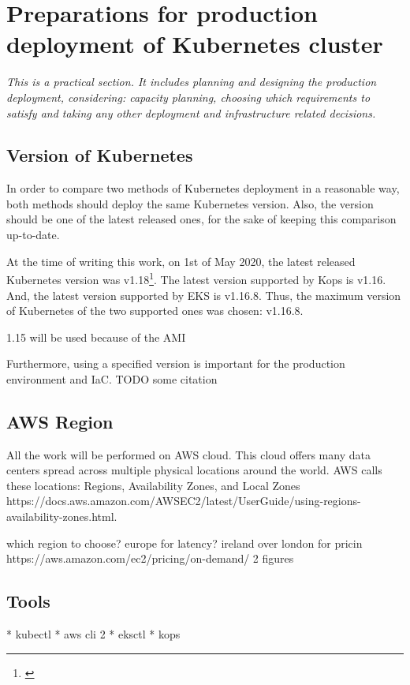 \section{Preparations for production deployment of Kubernetes cluster}
\textit{This is a practical section. It includes planning and designing the production deployment, considering: capacity planning, choosing which requirements to satisfy and taking any other deployment and infrastructure related decisions.}
~\\

\subsection{Version of Kubernetes}
In order to compare two methods of Kubernetes deployment in a reasonable way, both methods should deploy the same Kubernetes version. Also, the version should be one of the latest released ones, for the sake of keeping this comparison up-to-date.

At the time of writing this work, on 1st of May 2020, the latest released Kubernetes version was v1.18\footnote{\cite{online-k8s-blog-latest}}. The latest version supported by Kops is v1.16\cite{online-kops-versions}. And, the latest version supported by EKS is v1.16.8\cite{online-eksctl-versions}. Thus, the maximum version of Kubernetes of the two supported ones was chosen: v1.16.8.

1.15 will be used because of the AMI

Furthermore, using a specified version is important for the production environment and IaC. TODO some citation

\subsection{AWS Region}
All the work will be performed on AWS cloud. This cloud offers many data centers spread across multiple physical locations around the world. AWS calls these locations: Regions, Availability Zones, and Local Zones https://docs.aws.amazon.com/AWSEC2/latest/UserGuide/using-regions-availability-zones.html.

which region to choose? europe for latency? ireland over london for pricin https://aws.amazon.com/ec2/pricing/on-demand/
2 figures

\subsection{Tools}
* kubectl
* aws cli 2
* eksctl
* kops

